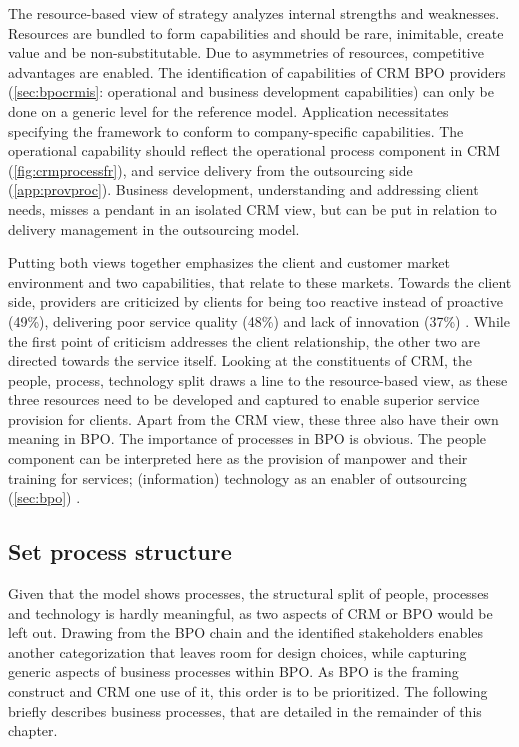 	The resource-based view of strategy \citep{wernerfelt1984resource} analyzes internal strengths and weaknesses. Resources are bundled to form capabilities and should be rare, inimitable, create value and be non-substitutable. Due to asymmetries of resources, competitive advantages are enabled. The identification of capabilities of CRM BPO providers (\cf \ref{sec:bpocrmis}: operational and business development capabilities) can only be done on a generic level for the reference model. Application necessitates specifying the framework to conform to company-specific capabilities. The operational capability should reflect the operational process component in CRM (\cf \ref{fig:crmprocessfr}), and service delivery from the outsourcing side (\cf \ref{app:provproc}). Business development, \ie understanding and addressing client needs, misses a pendant in an isolated CRM view, but can be put in relation to delivery management in the outsourcing model. 
	
	Putting both views together emphasizes the client and customer market environment and two capabilities, that relate to these markets. Towards the client side, providers are criticized by clients for being too reactive instead of proactive (49\%), delivering poor service quality (48\%) and lack of innovation (37\%) \citep{deloitte2014outsourcing}. While the first point of criticism addresses the client relationship, the other two are directed towards the service itself. Looking at the constituents of \acrshort{CRM}, the people, process, technology split draws a line to the resource-based view, as these three resources need to be developed and captured to enable superior service provision for clients. Apart from the  \acrshort{CRM} view, these three also have their own meaning in \acrshort{BPO}.  The importance of processes in  \acrshort{BPO} is obvious. The people component can be interpreted here as the provision of manpower and their training for services; (information) technology as an enabler of outsourcing (\cf \ref{sec:bpo}) . 
	
		
	\subsection{Set process structure}
	\label{sec:procstr}
	Given that the model shows processes, the structural split of people, processes and technology is hardly meaningful, as two aspects of  \acrshort{CRM} or \acrshort{BPO} would be left out. Drawing from the BPO chain and the identified stakeholders enables another categorization that leaves room for design choices, while capturing generic aspects of business processes within \acrshort{BPO}. As \acrshort{BPO} is the framing construct and  \acrshort{CRM} one use of it, this order is to be prioritized. The following briefly describes business processes, that are detailed in the remainder of this chapter.
	
